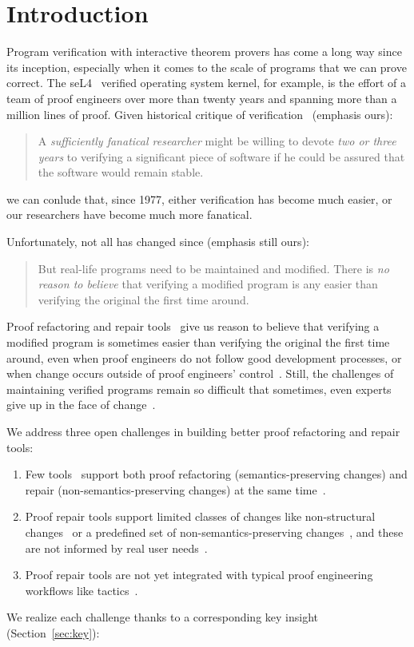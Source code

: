 \section{Introduction}

Program verification with interactive theorem provers has come a long way since its inception,
especially when it comes to the scale of programs that we can prove correct.
The seL4~\cite{Klein2009} verified operating system kernel, for example,
is the effort of a team of proof engineers over more than twenty years and spanning more than
a million lines of proof.
Given historical critique of verification~\cite{DeMillo1977} (emphasis ours):

\begin{quote}
A \textit{sufficiently fanatical researcher}
might be willing to devote \textit{two or 
three years} to verifying a significant 
piece of software if he could be 
assured that the software would remain stable.
\end{quote}
we can conlude that, since 1977, either verification has become much easier,
or our researchers have become much more fanatical.

Unfortunately, not all has changed since \citep{DeMillo1977} (emphasis still ours):

\begin{quote}
But real-life programs need to 
be maintained and modified. 
There is \textit{no reason to believe} that verifying a modified program is any 
easier than verifying the original the 
first time around.
\end{quote}
Proof refactoring and repair tools~\cite{wibergh2019, WhitesidePhD, Dietrich2013,
adams2015, Bourke12, Roe2016, robert2018, pumpkinpatch} give us reason to believe
that verifying a modified program is sometimes easier than verifying the original the first time
around, even when proof engineers do not follow good development processes,
or when change occurs outside of proof engineers' control~\cite{PGL-045}.
Still, the challenges of maintaining verified programs remain so difficult that
sometimes, even experts give up in the face of change~\cite{replica}.

We address three open challenges in building better proof refactoring and repair tools:

\begin{enumerate}
\item Few tools~\cite{robert2018, wibergh2019} support both proof refactoring (semantics-preserving changes) and repair (non-semantics-preserving changes) at the same time~\cite{PGL-045}.
\item Proof repair tools support limited classes of changes like non-structural changes~\cite{pumpkinpatch} or a predefined set
of non-semantics-preserving changes~\cite{robert2018, wibergh2019}, and these are not informed by real user needs~\cite{replica}.
\item Proof repair tools are not yet integrated with typical proof engineering workflows like tactics~\cite{PGL-045, pumpkinpatch, robert2018}.
\end{enumerate}
We realize each challenge thanks to a corresponding key insight (Section~\ref{sec:key}): %

